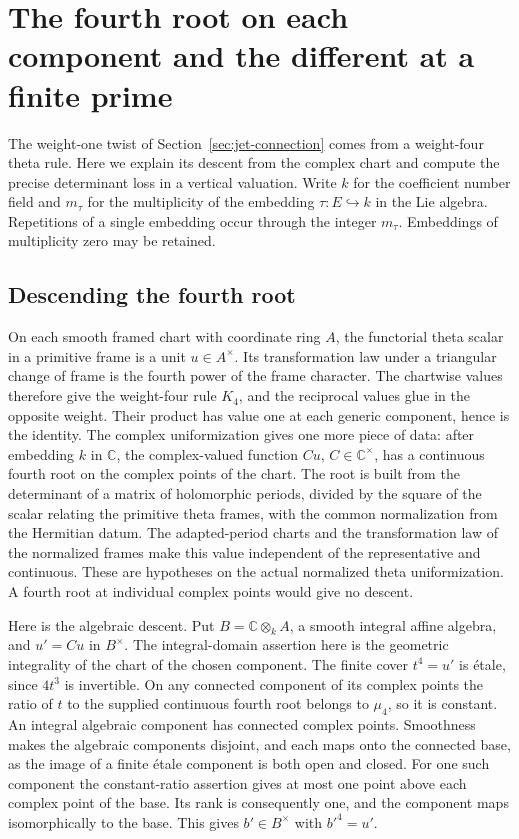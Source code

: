 \section{The fourth root on each component and the different at a finite prime}
\label{sec:key-different}

The weight-one twist of Section~\ref{sec:jet-connection} comes from a
weight-four theta rule. Here we explain its descent from the complex
chart and compute the precise determinant loss in a vertical
valuation. Write \(k\) for the coefficient number field and
\(m_\tau\) for the multiplicity of the embedding \(\tau:E\hookrightarrow k\)
in the Lie algebra. Repetitions of a single embedding occur through
the integer \(m_\tau\). Embeddings of multiplicity zero may be retained.

\subsection{Descending the fourth root}

On each smooth framed chart with coordinate ring \(A\), the
functorial theta scalar in a primitive frame is a unit \(u\in A^\times\).
Its transformation law under a triangular change of frame is the
fourth power of the frame character. The chartwise values therefore
give the weight-four rule \(K_4\), and the reciprocal values glue
in the opposite weight. Their product has value one at each generic
component, hence is the identity. The complex uniformization gives
one more piece of data: after embedding \(k\) in \(\mathbb C\), the
complex-valued function \(C u\), \(C\in\mathbb C^\times\), has a
continuous fourth root on the complex points of the chart. The root
is built from the determinant of a matrix of holomorphic periods,
divided by the square of the scalar relating the primitive theta
frames, with the common normalization from the Hermitian datum.
The adapted-period charts and the transformation law of the normalized
frames make this value independent of the representative and
continuous. These are hypotheses on the actual normalized theta
uniformization. A fourth root at individual complex points would
give no descent.

Here is the algebraic descent. Put
\(B=\mathbb C\otimes_k A\), a smooth integral affine algebra, and
\(u'=Cu\) in \(B^\times\). The integral-domain assertion here is
the geometric integrality of the chart of the chosen component.
The finite cover \(t^4=u'\) is étale, since \(4t^3\) is invertible.
On any connected component of its complex points the ratio of \(t\)
to the supplied continuous fourth root belongs to \(\mu_4\), so it
is constant. An integral algebraic component has connected complex
points. Smoothness makes the algebraic components disjoint, and
each maps onto the connected base, as the image of a finite étale
component is both open and closed. For one such component the
constant-ratio assertion gives at most one point above each complex
point of the base. Its rank is consequently one, and the component
maps isomorphically to the base. This gives \(b'\in B^\times\)
with \(b'^4=u'\).

